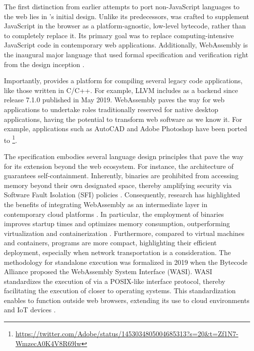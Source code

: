 The first distinction from earlier attempts to port non-JavaScript languages to the web lies in \Wasm's initial design. 
Unlike its predecessors, \Wasm was crafted to supplement JavaScript in the browser as a platform-agnostic, low-level bytecode, rather than to completely replace it. 
Its primary goal was to replace computing-intensive JavaScript code in contemporary web applications. 
Additionally, WebAssembly is the inaugural major language that used formal specification and verification right from the design inception \cite{Haas_2017, watt2018mechanising}. 


Importantly, \Wasm provides a platform for compiling several legacy code applications, like those written in C/C++. 
For example, LLVM includes \Wasm as a backend since release 7.1.0 published in May 2019.
WebAssembly paves the way for web applications to undertake roles traditionally reserved for native desktop applications, having the potential to transform web software as we know it. 
For example, applications such as AutoCAD and Adobe Photoshop have been ported to \Wasm \footnote{\url{https://twitter.com/Adobe/status/1453034805004685313?s=20&t=Zf1N7-WmzecA0K4V8R69lw}}. 


The \Wasm specification embodies several language design principles that pave the way for its extension beyond the web ecosystem.
For instance, the architecture of \Wasm guarantees self-containment.
Inherently, \Wasm binaries are prohibited from accessing memory beyond their own designated space, thereby amplifying security via Software Fault Isolation (SFI)  policies \cite{gobi}.
Consequently, research has highlighted the benefits of integrating WebAssembly as an intermediate layer in contemporary cloud platforms \cite{pMendkiServerless}.
In particular, the employment of \Wasm binaries improves startup times and optimizes memory consumption, outperforming virtualization and containerization \cite{1244493Jacobsson}.
Furthermore, compared to virtual machines and containers, \Wasm programs are more compact, highlighting their efficient deployment, especially when network transportation is a consideration.
The methodology for standalone \Wasm execution was formalized in 2019 when the Bytecode Alliance proposed the WebAssembly System Interface (WASI).
WASI standardizes the execution of \Wasm via a POSIX-like interface protocol, thereby facilitating the execution of \Wasm closer to operating systems.
This standardization enables \Wasm to function outside web browsers, extending its use to cloud environments and IoT devices \cite{10.1145/3526059.3533618, 10.1145/3572848.3577436}.

